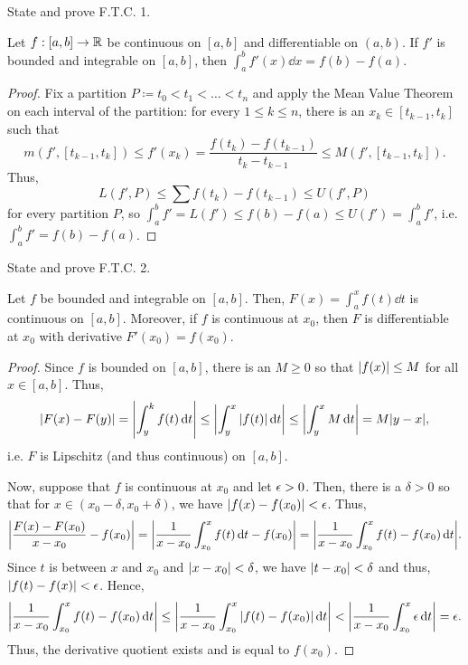 \documentclass{article}
\begin{document}
\begin{problem}
State and prove F.T.C. 1.
\begin{solution}
	\begin{theorem*}[F.T.C. 1]
		Let $f : [a, b] \to \mathbb{R}$ be continuous on $[a, b]$ and differentiable on $(a, b)$.
		If $f'$ is bounded and integrable on $[a, b]$, then $\int_a^b f'(x) \dd{x} = f(b) - f(a)$.
	\end{theorem*}
	\begin{proof}
		Fix a partition $P \coloneq t_0 < t_1 < \dots < t_n$ and apply the Mean Value Theorem on each interval of the partition:
		for every $1 \le k \le n$, there is an $x_k \in [t_{k - 1}, t_k]$ such that
		\[ m(f', [t_{k - 1}, t_k]) \le f'(x_k) = \frac{f(t_k) - f(t_{k - 1})}{t_k - t_{k - 1}} \le M(f', [t_{k - 1}, t_k]). \]
		Thus,
		\[
			L(f', P) \le \sum f(t_k) - f(t_{k - 1}) \le U(f', P)
		\]
		for every partition $P$, so $\int_a^b f' = L(f') \le f(b) - f(a) \le U(f') = \int_a^b f'$, i.e. $\int_a^b f' = f(b) - f(a)$.
	\end{proof}
\end{solution}
\end{problem}

\begin{problem}
State and prove F.T.C. 2.
\begin{solution}
	\begin{theorem*}[F.T.C. 2]
		Let $f$ be bounded and integrable on $[a, b]$.
		Then, $F(x) = \int_a^x f(t) \dd{t}$ is continuous on $[a, b]$.
		Moreover, if $f$ is continuous at $x_0$, then $F$ is differentiable at $x_0$ with derivative
		$F'(x_0) = f(x_0)$.
	\end{theorem*}
	\begin{proof}
		Since $f$ is bounded on $[a, b]$, there is an $M \ge 0$ so that $\abs{f(x)} \le M$ for all $x \in [a, b]$.
		Thus,
		\[
			\abs{F(x) - F(y)} = \abs{\int_y^k f(t) \dd{t}} \le \abs{\int_y^x \abs{f(t)} \dd{t}} \le \abs{\int_y^x M \dd{t}} = M \abs{y - x},
		\]
		i.e. $F$ is Lipschitz (and thus continuous) on $[a, b]$.

		Now, suppose that $f$ is continuous at $x_0$ and let $\epsilon > 0$.
		Then, there is a $\delta > 0$ so that for $x \in (x_0 - \delta, x_0 + \delta)$, we have $\abs{f(x) - f(x_0)} < \epsilon$.
		Thus,
		\[
			\abs{\frac{F(x) - F(x_0)}{x - x_0} - f(x_0)} = \abs{\frac1{x - x_0} \int_{x_0}^x f(t) \dd{t} - f(x_0)} = \abs{\frac1{x - x_0} \int_{x_0}^x f(t) - f(x_0) \dd{t}}.
		\]
		Since $t$ is between $x$ and $x_0$ and $\abs{x - x_0} < \delta$, we have $\abs{t - x_0} < \delta$ and thus, $\abs{f(t) - f(x)} < \epsilon$.
		Hence,
		\[
			\abs{\frac1{x - x_0} \int_{x_0}^x f(t) - f(x_0) \dd{t}} \le \abs{\frac1{x - x_0} \int_{x_0}^x \abs{f(t) - f(x_0)} \dd{t}} < \abs{\frac1{x - x_0} \int_{x_0}^x \epsilon \dd{t}} = \epsilon.
		\]
		Thus, the derivative quotient exists and is equal to $f(x_0)$.
	\end{proof}
\end{solution}
\end{problem}
\end{document}
